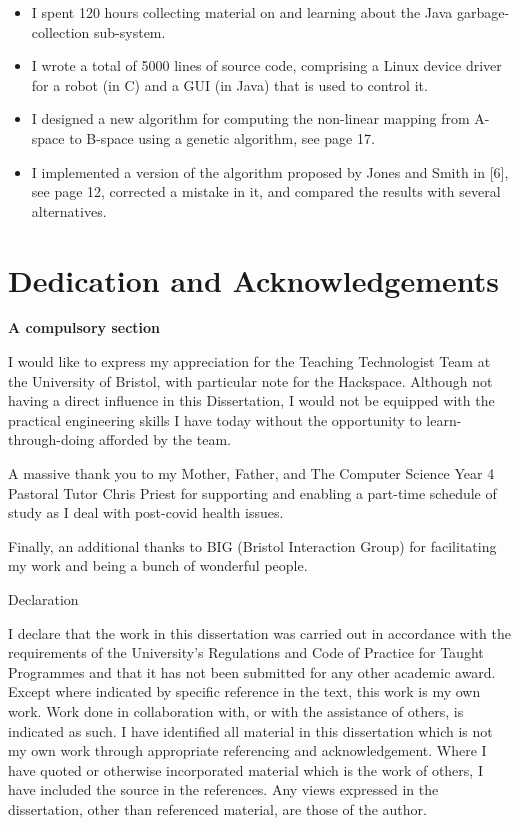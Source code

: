 \documentclass[a4paper]{article}
\newcommand\liststyleWWNumxiii{%
\renewcommand\labelitemi{[F0B7?]}
\renewcommand\labelitemii{o}
\renewcommand\labelitemiii{[F0A7?]}
\renewcommand\labelitemiv{[F0B7?]}
}
\begin{document}
\liststyleWWNumxiii
\begin{itemize}
\item I spent 120 hours collecting material on and learning about the Java garbage-collection sub-system.
\item I wrote a total of 5000 lines of source code, comprising a Linux device driver for a robot (in C) and a GUI (in
Java) that is used to control it.
\item I designed a new algorithm for computing the non-linear mapping from A-space to B-space using a genetic algorithm,
see page 17.
\item I implemented a version of the algorithm proposed by Jones and Smith in [6], see page 12, corrected a mistake in
it, and compared the results with several alternatives.
\end{itemize}
\clearpage\section{Dedication and Acknowledgements}
\hypertarget{Toc98342026}{}
\bigskip

\textbf{A compulsory section}


\bigskip

I would like to express my appreciation for the Teaching Technologist Team at the University of Bristol, with particular
note for the Hackspace. Although not having a direct influence in this Dissertation, I would not be equipped with the
practical engineering skills I have today without the opportunity to learn-through-doing afforded by the team.


\bigskip

A massive thank you to my Mother, Father, and The Computer Science Year 4 Pastoral Tutor Chris Priest for supporting and
enabling a part-time schedule of study as I deal with post-covid health issues.


\bigskip

Finally, an additional thanks to BIG (Bristol Interaction Group) for facilitating my work and being a bunch of wonderful
people.


\bigskip


\bigskip

\clearpage
Declaration


\bigskip


\bigskip

I declare that the work in this dissertation was carried out in accordance with the requirements of the University's
Regulations and Code of Practice for Taught Programmes and that it has not been submitted for any other academic award.
Except where indicated by specific reference in the text, this work is my own work. Work done in collaboration with, or
with the assistance of others, is indicated as such. I have identified all material in this dissertation which is not
my own work through appropriate referencing and acknowledgement. Where I have quoted or otherwise incorporated material
which is the work of others, I have included the source in the references. Any views expressed in the dissertation,
other than referenced material, are those of the author.
\end{document}
